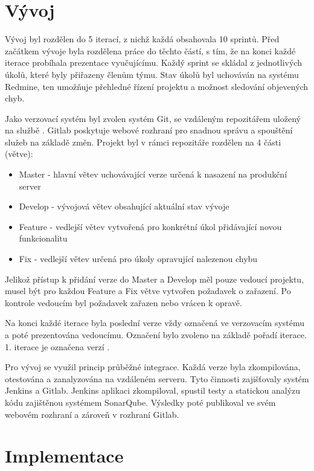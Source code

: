 \documentclass[thesis=B,czech]{FITthesis}[2012/06/26]
\begin{document}
\section{Vývoj}
Vývoj byl rozdělen do 5 iterací, z nichž každá obsahovala 10 sprintů. Před začátkem vývoje byla rozdělena práce do těchto částí, 
s tím, že na konci každé iterace probíhala prezentace vyučujícímu. Každý sprint se skládal z jednotlivých
úkolů, které byly přiřazeny členům týmu. Stav úkolů byl uchováván na systému Redmine\cite{Redmine}, ten umožňuje přehledné řízení projektu
a možnost sledování objevených chyb.
\par
Jako verzovací systém byl zvolen systém Git, se vzdáleným repozitářem uložený na službě \cite{gitlab}. Gitlab poskytuje webové rozhraní pro snadnou správu a spouštění služeb na základě změn. Projekt byl v rámci repozitáře rozdělen na 4 části (větve):
\begin{itemize}
\item Master - hlavní větev uchovávající verze určená k nasazení na produkční server
\item Develop - vývojová větev obsahující aktuální stav vývoje
\item Feature - vedlejší větev vytvořená pro konkrétní úkol přidávající novou funkcionalitu
\item Fix - vedlejší větev určená pro úkoly opravující nalezenou chybu
\end{itemize}
Jelikož přístup k přidání verze do Master a Develop měl pouze vedoucí projektu, musel být pro každou Feature a Fix větve
vytvořen požadavek o zařazení. Po kontrole vedoucím byl požadavek zařazen nebo vrácen k opravě.
\par
Na konci každé iterace byla poslední verze vždy označená ve verzovacím systému a poté prezentována vedoucímu.
Označení bylo zvoleno na základě pořadí iterace. 1. iterace je označena verzí .
\par
Pro vývoj se využil princip průběžné integrace. Každá verze byla zkompilována, otestována a zanalyzována na vzdáleném serveru.
Tyto činnosti zajišťovaly systém Jenkins\cite{jenkins} a Gitlab. Jenkins aplikaci zkompiloval, spustil testy a statickou analýzu kódu 
zajištěnou systémem SonarQube\cite{sonar}. Výsledky poté publikoval ve svém webovém rozhraní a zároveň v rozhraní Gitlab.  
\section{Implementace}
\end{document}
